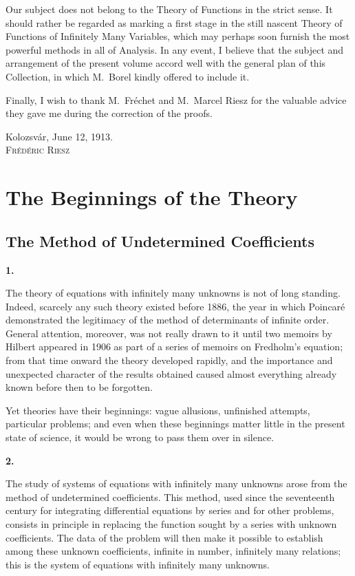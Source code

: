 \documentclass[
  paper=b5,
  fontsize=13pt,
  twoside=true,
  open=any,
  bookmarkpackage=false,
  chapterprefix=true,
  headings=normal
]{scrbook}
\theoremstyle{definition}
\newcommand{\numberedparagraph}[1]{%
  \par\medskip\phantomsection\label{sec:#1}%
  \noindent\textbf{#1.}\enspace
}
\begin{document}
Our subject does not belong to the Theory of Functions in the strict sense. It
should rather be regarded as marking a first stage in the still nascent Theory of
Functions of Infinitely Many Variables, which may perhaps soon furnish the most
powerful methods in all of Analysis. In any event, I believe that the subject and
arrangement of the present volume accord well with the general plan of this
Collection, in which M.~Borel kindly offered to include it.

Finally, I wish to thank M.~Fréchet and M.~Marcel Riesz for the valuable advice
they gave me during the correction of the proofs.

\begin{flushright}
  Kolozsvár, June 12, 1913.\\[0.6em]
  \textsc{Frédéric Riesz}
\end{flushright}

\clearpage

\chapter{The Beginnings of the Theory}\label{chap:1}

\section{The Method of Undetermined Coefficients}

\numberedparagraph{1}
The theory of equations with infinitely many unknowns is not of long standing. Indeed, scarcely any such theory existed before 1886, the year in which Poincar\'e demonstrated the legitimacy of the method of determinants of infinite order. General attention, moreover, was not really drawn to it until two memoirs by Hilbert appeared in 1906 as part of a series of memoirs on Fredholm's equation; from that time onward the theory developed rapidly, and the importance and unexpected character of the results obtained caused almost everything already known before then to be forgotten.

Yet theories have their beginnings: vague allusions, unfinished attempts, particular problems; and even when these beginnings matter little in the present state of science, it would be wrong to pass them over in silence.

\numberedparagraph{2}
The study of systems of equations with infinitely many unknowns arose from the method of undetermined coefficients. This method, used since the seventeenth century for integrating differential equations by series and for other problems, consists in principle in replacing the function sought by a series with unknown coefficients. The data of the problem will then make it possible to establish among these unknown coefficients, infinite in number, infinitely many relations; this is the system of equations with infinitely many unknowns.
\end{document}
